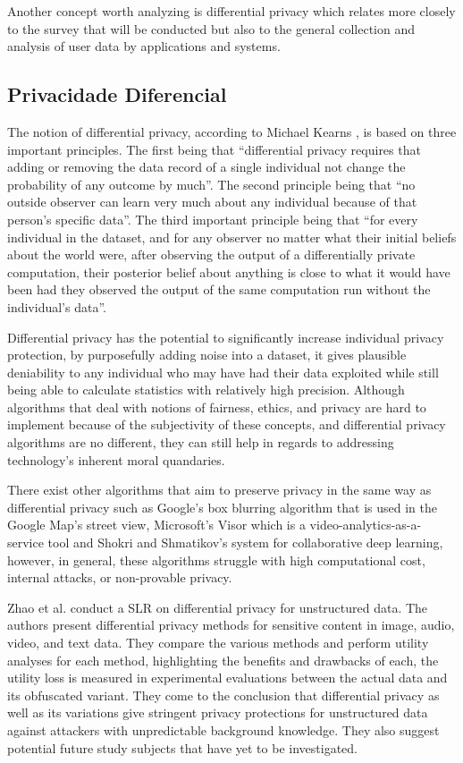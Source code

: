 \documentclass[conference]{IEEEtran}
\begin{document}
Another concept worth analyzing is differential privacy which relates more
closely to the survey that will be conducted but also to the general
collection and analysis of user data by applications and systems.

\subsection{Privacidade Diferencial}

The notion of differential privacy, according to Michael Kearns \cite{kearns2019ethical},
is based on three important principles. The first being that ``differential
privacy requires that adding or removing the data record of a single individual
not change the probability of any outcome by much''. The second principle
being that ``no outside observer can learn very much about any individual
because of that person's specific data''. The third important principle
being that ``for every individual in the dataset, and for any observer no
matter what their initial beliefs about the world were, after observing
the output of a differentially private computation, their posterior belief
about anything is close to what it would have been had they observed the
output of the same computation run without the individual's data''.

Differential privacy has the potential to significantly increase individual
privacy protection, by purposefully adding noise into a dataset, it gives
plausible deniability to any individual who may have had their data exploited
while still being able to calculate statistics with relatively high precision.
Although algorithms that deal with notions of fairness, ethics, and privacy
are hard to implement because of the subjectivity of these concepts, and
differential privacy algorithms are no different, they can still help in
regards to addressing technology's inherent moral quandaries.

There exist other algorithms that aim to preserve privacy in the same way
as differential privacy such as Google's box blurring algorithm \cite{FromeLarge}
that is used in the Google Map's street view, Microsoft's Visor \cite{poddar2020visor}
which is a video-analytics-as-a-service tool and Shokri and Shmatikov's
\cite{ShokriPrivacy} system for collaborative deep learning, however, in
general, these algorithms struggle with high computational cost, internal
attacks, or non-provable privacy.

Zhao et al. \cite{ZhaoSurvey} conduct a SLR on differential privacy for
unstructured data. The authors present differential privacy methods for
sensitive content in image, audio, video, and text data. They compare the
various methods and perform utility analyses for each method, highlighting
the benefits and drawbacks of each, the utility loss is measured in experimental
evaluations between the actual data and its obfuscated variant. They come
to the conclusion that differential privacy as well as its variations give
stringent privacy protections for unstructured data against attackers with
unpredictable background knowledge. They also suggest potential future study
subjects that have yet to be investigated.
\end{document}
